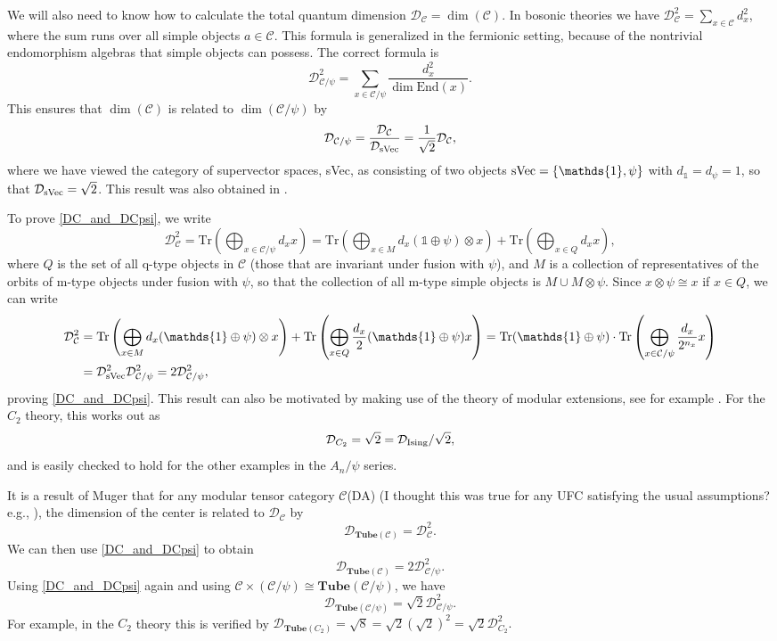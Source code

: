 \documentclass[12pt,a4paper]{article}
\newcommand{\tp}{\otimes}
\newcommand{\unit}{\mathds{1}}
\newcommand{\mcd}{\mathcal{D}}
\newcommand{\mcc}{\mathcal{C}}
\newcommand\be            {\begin{equation}}
\newcommand\ee            {\end{equation}}
\newcommand{\End}{\text{End}}
\newcommand{\tube}{\textbf{Tube}}
\newcommand{\dave}[1]{{\color{ao(english)}\footnotesize{(DA) #1}}}
\begin{document}
We will also need to know how to calculate the total quantum dimension $\mcd_\mcc = \dim(\mcc)$.
In bosonic theories we have $\mcd_\mcc^2 = \sum_{x\in \mcc} d_x^2$, where the sum runs over all simple objects $a\in\mcc$. 
This formula is generalized in the fermionic setting, because of the nontrivial endomorphism algebras that simple objects can possess.  
The correct formula is
\be \label{total_qdim_defn} \mcd_{\mcc/\psi}^2 = \sum_{x\in \mcc/\psi} \frac{d_x^2}{\dim \End(x)}.\ee
This ensures that $\dim(\mcc)$ is related to $\dim(\mcc / \psi)$ by 
\be \label{DC_and_DCpsi} \mcd_{\mcc / \psi} = \frac{\mcd_\mcc}{\mcd_{\rm sVec}} = \frac{1}{\sqrt{2}} \mcd_\mcc,\ee
where we have viewed the category of supervector spaces, sVec, as consisting of two objects 
${\rm sVec} = \{\unit,\psi\}$ with $d_\unit=d_\psi=1$, so that $\mcd_{\rm sVec} = \sqrt{2}$. 
This result was also obtained in \cite{wan2016}. 

To prove \eqref{DC_and_DCpsi}, we write 
\be
\mcd_\mcc^2 = \text{Tr} \left(\bigoplus_{x\in \mcc/\psi} d_x x\right) = \text{Tr} \left( \bigoplus_{x \in M} d_x (\mathds{1} \oplus \psi) \tp x \right ) + \text{Tr} \left(\bigoplus_{x  \in Q} {d_x} x \right),\ee
where $Q$ is the set of all q-type objects in $\mcc$ (those that are invariant under fusion with $\psi$), 
and $M$ is a collection of representatives of the orbits of m-type objects under fusion with $\psi$, so that 
the collection of all m-type simple objects is $M\cup M\tp \psi$.   
Since $x\tp \psi \cong x$ if $x\in Q$, we can write
\begin{align}
\mcd_\mcc^2 & = \text{Tr} \left( \bigoplus_{x \in M} d_x (\mathds{1} \oplus \psi) \tp x \right ) + 
\text{Tr}  \left(\bigoplus_{x  \in Q}\frac{d_x}{2}(\unit \oplus \psi) x \right) = \text{Tr}(\unit \oplus \psi) 
\cdot \text{Tr} \left( \bigoplus_{x \in \mcc/\psi} \frac{d_x}{2^{n_x}} x \right) \\ & = \mcd^2_{\rm sVec} 
\mcd_{\mcc/\psi}^2 = 2 \mcd_{\mcc/\psi}^2,
\end{align}
proving \eqref{DC_and_DCpsi}. 
This result can also be motivated by making use of the theory of modular extensions, see for example \cite{lan2016}. 
For the $C_2$ theory, this works out as 
\be \mcd_{C_2} = \sqrt{2} = \mcd_{\rm Ising} / \sqrt{2},\ee
and is easily checked to hold for the other examples in the $A_n / \psi$ series.  

It is a result of Muger \cite{muger2003a} that for any modular tensor category $\mcc$\dave{(I thought this was true for any UFC satisfying the usual assumptions? e.g., \cite{muger2003b})}, 
the dimension of the center is related to $\mcd_\mcc$ by 
\be \mcd_{\tube(\mcc)} =\mcd^2_\mcc.\ee
We can then use \eqref{DC_and_DCpsi} to obtain 
\be \mcd_{\tube(\mcc)} = 2\mcd^2_{\mcc/\psi}.\ee
Using \eqref{DC_and_DCpsi} again and using $\mcc \times (\mcc/\psi) \cong \tube(\mcc/\psi)$, we have 
\be \mcd_{\tube(\mcc/\psi)} = \sqrt{2}\mcd^2_{\mcc/\psi}.\ee
For example, in the $C_2$ theory this is verified by $\mcd_{\tube(C_2)} = \sqrt{8} = \sqrt{2} (\sqrt{2})^2 = \sqrt{2} \mcd^2_{C_2}.$
\end{document}
